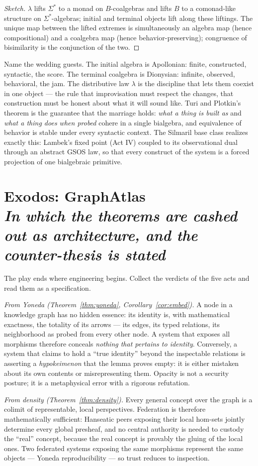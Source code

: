 \documentclass[11pt]{article}
\theoremstyle{plain}
\theoremstyle{definition}
\theoremstyle{remark}
\newcommand{\act}[2]{\section{#1 \\ {\normalsize\normalfont\itshape #2}}}
\begin{document}
\begin{proof}[Sketch]
$\lambda$ lifts $\Sigma^{*}$ to a monad on $B$-coalgebras and lifts $B$ to a comonad-like structure on $\Sigma^{*}$-algebras; initial and terminal objects lift along these liftings. The unique map between the lifted extremes is simultaneously an algebra map (hence compositional) and a coalgebra map (hence behavior-preserving); congruence of bisimilarity is the conjunction of the two.
\end{proof}

Name the wedding guests. The initial algebra is Apollonian: finite, constructed, syntactic, the score. The terminal coalgebra is Dionysian: infinite, observed, behavioral, the jam. The distributive law $\lambda$ is the discipline that lets them coexist in one object --- the rule that improvisation must respect the changes, that construction must be honest about what it will sound like. Turi and Plotkin's theorem is the guarantee that the marriage holds: \emph{what a thing is built as} and \emph{what a thing does when probed} cohere in a single bialgebra, and equivalence of behavior is stable under every syntactic context. The Silmaril base class realizes exactly this: Lambek's fixed point (Act IV) coupled to its observational dual through an abstract GSOS law, so that every construct of the system is a forced projection of one bialgebraic primitive.

\act{Exodos: GraphAtlas}{In which the theorems are cashed out as architecture, and the counter-thesis is stated}

The play ends where engineering begins. Collect the verdicts of the five acts and read them as a specification.

\emph{From Yoneda (Theorem~\ref{thm:yoneda}, Corollary~\ref{cor:embed}).} A node in a knowledge graph has no hidden essence: its identity is, with mathematical exactness, the totality of its arrows --- its edges, its typed relations, its neighborhood as probed from every other node. A system that exposes all morphisms therefore conceals \emph{nothing that pertains to identity}. Conversely, a system that claims to hold a ``true identity'' beyond the inspectable relations is asserting a \emph{hypokeimenon} that the lemma proves empty: it is either mistaken about its own contents or misrepresenting them. Opacity is not a security posture; it is a metaphysical error with a rigorous refutation.

\emph{From density (Theorem~\ref{thm:density}).} Every general concept over the graph is a colimit of representable, local perspectives. Federation is therefore mathematically sufficient: Hanseatic peers exposing their local hom-sets jointly determine every global presheaf, and no central authority is needed to custody the ``real'' concept, because the real concept is provably the gluing of the local ones. Two federated systems exposing the same morphisms represent the same objects --- Yoneda reproducibility --- so trust reduces to inspection.
\end{document}
